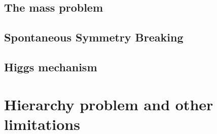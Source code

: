 \subsection{The mass problem}
\label{sec:mass}

\subsection{Spontaneous Symmetry Breaking}
\label{sec:SSB}

\subsection{Higgs mechanism}
\label{sec:higgs}

\section{Hierarchy problem and other limitations}
\label{sec:hier}

